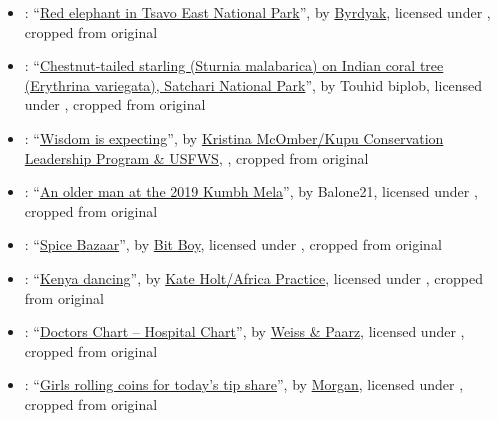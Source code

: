 \begin{itemize}
\item {}: ``\href{https://commons.wikimedia.org/wiki/File:Red_elephant_in_dirt.jpg}{Red elephant in Tsavo East National Park}'', by \href{https://commons.wikimedia.org/wiki/User:Byrdyak}{Byrdyak}, licensed under , cropped from original

\item {}: ``\href{https://commons.wikimedia.org/wiki/File:Chestnut-tailed_starling_-_%E0%A6%95%E0%A6%BE%E0%A6%A0_%E0%A6%B6%E0%A6%BE%E0%A6%B2%E0%A6%BF%E0%A6%95.jpg}{Chestnut-tailed starling (Sturnia malabarica) on Indian coral tree (Erythrina variegata), Satchari National Park}'', by Touhid biplob, licensed under \CCBYSA{4.0}, cropped from original

\item {}: ``\href{https://www.flickr.com/photos/usfwspacific/31368620171/in/album-72157632891366006/}{Wisdom is expecting}'', by \href{https://www.flickr.com/people/usfwspacific/}{Kristina McOmber/Kupu Conservation Leadership Program \& USFWS}, , cropped from original

\item {}: ``\href{https://commons.wikimedia.org/wiki/File:2019_Jan_15_-_Prayagraj_Kumbh_Mela_-_Portrait_of_an_Older_Man.jpg}{An older man at the 2019 Kumbh Mela}'', by Balone21, licensed under , cropped from original

\item {}: ``\href{https://www.flickr.com/photos/bitboy/7634965560/}{Spice Bazaar}'', by \href{https://www.flickr.com/people/bitboy/}{Bit Boy}, licensed under , cropped from original

\item {}: ``\href{https://www.flickr.com/photos/dfataustralianaid/10706364576/in/album-72157637430496785/}{Kenya dancing}'', by \href{https://www.flickr.com/people/dfataustralianaid/}{Kate Holt/Africa Practice}, licensed under , cropped from original

\item {}: ``\href{https://www.flickr.com/photos/141290938@N03/26682727064/}{Doctors Chart -- Hospital Chart}'', by \href{http://www.weisspaarz.com/}{Weiss \& Paarz}, licensed under , cropped from original

\item {}: ``\href{https://www.flickr.com/photos/meddygarnet/4423075785/}{Girls rolling coins for today's tip share}'', by \href{https://www.flickr.com/people/meddygarnet/}{Morgan}, licensed under , cropped from original


\end{itemize}
